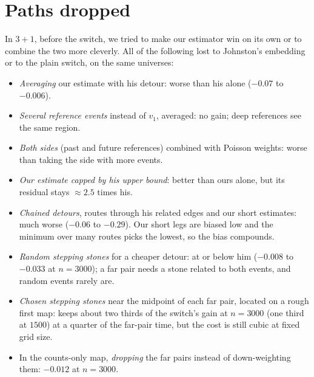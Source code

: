 \documentclass[11pt,a4paper]{article}
\begin{document}
\appendix
\section{Paths dropped}\label{app:dropped}
In $3+1$, before the switch, we tried to make our estimator win on its own or to combine the two more cleverly. All of the following lost to Johnston's embedding or to the plain switch, on the same universes:
\begin{itemize}[leftmargin=*,itemsep=1pt]
\item \emph{Averaging} our estimate with his detour: worse than his alone ($-0.07$ to $-0.006$).
\item \emph{Several reference events} instead of $v_1$, averaged: no gain; deep references see the same region.
\item \emph{Both sides} (past and future references) combined with Poisson weights: worse than taking the side with more events.
\item \emph{Our estimate capped by his upper bound}: better than ours alone, but its residual stays $\approx2.5$ times his.
\item \emph{Chained detours}, routes through his related edges and our short estimates: much worse ($-0.06$ to $-0.29$). Our short legs are biased low and the minimum over many routes picks the lowest, so the bias compounds.
\item \emph{Random stepping stones} for a cheaper detour: at or below him ($-0.008$ to $-0.033$ at $n=3000$); a far pair needs a stone related to both events, and random events rarely are.
\item \emph{Chosen stepping stones} near the midpoint of each far pair, located on a rough first map: keeps about two thirds of the switch's gain at $n=3000$ (one third at $1500$) at a quarter of the far-pair time, but the cost is still cubic at fixed grid size.
\item In the counts-only map, \emph{dropping} the far pairs instead of down-weighting them: $-0.012$ at $n=3000$.
\end{itemize}
\end{document}
